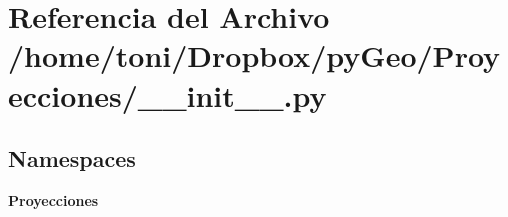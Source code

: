 \section{Referencia del Archivo /home/toni/\-Dropbox/py\-Geo/\-Proyecciones/\-\_\-\-\_\-init\-\_\-\-\_\-.py}
\label{Proyecciones_2____init_____8py}
\subsection*{Namespaces}
\begin{DoxyCompactItemize}
\item 
{\bf Proyecciones}
\end{DoxyCompactItemize}

